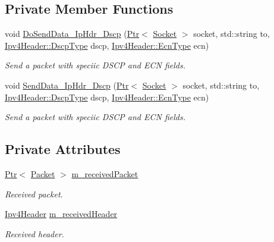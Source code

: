 \subsection*{Private Member Functions}
\begin{DoxyCompactItemize}
\item 
void \hyperlink{classIpv4HeaderTest_add7c6ef7aa63f94ed04b22090ccc551e}{Do\+Send\+Data\+\_\+\+Ip\+Hdr\+\_\+\+Dscp} (\hyperlink{classns3_1_1Ptr}{Ptr}$<$ \hyperlink{classns3_1_1Socket}{Socket} $>$ socket, std\+::string to, \hyperlink{classns3_1_1Ipv4Header_aaa17802e7732a689311b72d48d1a3450}{Ipv4\+Header\+::\+Dscp\+Type} dscp, \hyperlink{classns3_1_1Ipv4Header_a9cec46635fa719f0d58234cf8805991b}{Ipv4\+Header\+::\+Ecn\+Type} ecn)
\begin{DoxyCompactList}\small\item\em Send a packet with speciic D\+S\+CP and E\+CN fields. \end{DoxyCompactList}\item 
void \hyperlink{classIpv4HeaderTest_afbd0cfc4212b3a0d8846faa662cbc7bc}{Send\+Data\+\_\+\+Ip\+Hdr\+\_\+\+Dscp} (\hyperlink{classns3_1_1Ptr}{Ptr}$<$ \hyperlink{classns3_1_1Socket}{Socket} $>$ socket, std\+::string to, \hyperlink{classns3_1_1Ipv4Header_aaa17802e7732a689311b72d48d1a3450}{Ipv4\+Header\+::\+Dscp\+Type} dscp, \hyperlink{classns3_1_1Ipv4Header_a9cec46635fa719f0d58234cf8805991b}{Ipv4\+Header\+::\+Ecn\+Type} ecn)
\begin{DoxyCompactList}\small\item\em Send a packet with speciic D\+S\+CP and E\+CN fields. \end{DoxyCompactList}\end{DoxyCompactItemize}
\subsection*{Private Attributes}
\begin{DoxyCompactItemize}
\item 
\hyperlink{classns3_1_1Ptr}{Ptr}$<$ \hyperlink{classns3_1_1Packet}{Packet} $>$ \hyperlink{classIpv4HeaderTest_a4806396ea5249b214fce8a349f40b07b}{m\+\_\+received\+Packet}
\begin{DoxyCompactList}\small\item\em Received packet. \end{DoxyCompactList}\item 
\hyperlink{classns3_1_1Ipv4Header}{Ipv4\+Header} \hyperlink{classIpv4HeaderTest_a667ff4bfd280469a2814685903b1159f}{m\+\_\+received\+Header}
\begin{DoxyCompactList}\small\item\em Received header. \end{DoxyCompactList}\end{DoxyCompactItemize}
